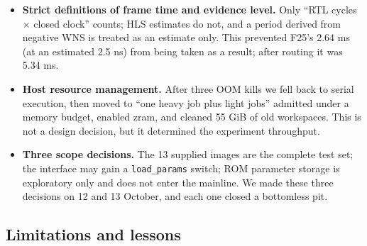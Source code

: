 \begin{itemize}
\item \textbf{Strict definitions of frame time and evidence level.} Only ``RTL cycles $\times$ closed clock'' counts; HLS estimates do not, and a period derived from negative WNS is treated as an estimate only. This prevented F25's 2.64 ms (at an estimated 2.5 ns) from being taken as a result; after routing it was 5.34 ms.
\item \textbf{Host resource management.} After three OOM kills we fell back to serial execution, then moved to ``one heavy job plus light jobs'' admitted under a memory budget, enabled zram, and cleaned 55 GiB of old workspaces. This is not a design decision, but it determined the experiment throughput.
\item \textbf{Three scope decisions.} The 13 supplied images are the complete test set; the interface may gain a \texttt{load\_params} switch; ROM parameter storage is exploratory only and does not enter the mainline. We made these three decisions on 12 and 13 October, and each one closed a bottomless pit.
\end{itemize}

\subsection{Limitations and lessons}\label{sec:3.7}

